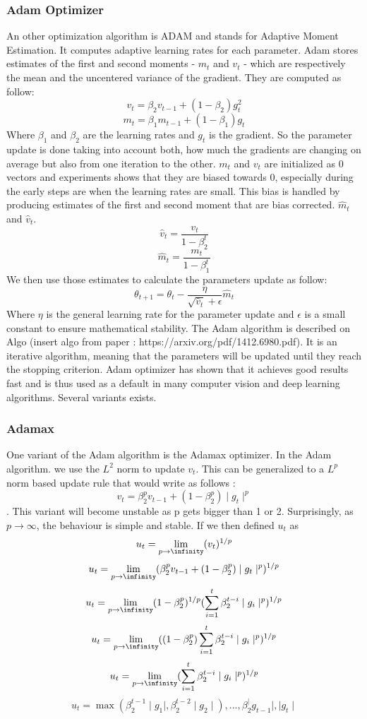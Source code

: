 \subsubsection{Adam Optimizer}
An other optimization algorithm is ADAM and stands for Adaptive Moment Estimation. It computes adaptive learning rates for each parameter. Adam stores estimates of the first and second moments - \(m_t\) and \(v_t\) - which are respectively the mean and the uncentered variance of the gradient. They are computed as follow: \[ v_t = \beta_2 v_{t-1} + (1 - \beta_2)g_t^2 \] \[m_t = \beta_1 m_{t-1} + (1 - \beta_1)g_t \]
Where \(\beta_1\) and \(\beta_2\) are the learning rates and \(g_t\) is the gradient. So the parameter update is done taking into account both, how much the gradients are changing on average but also from one iteration to the other.  \(m_t\) and \(v_t\) are initialized as 0 vectors and experiments shows that they are biased towards 0, especially during the early steps are when the learning rates are small. This bias is handled by producing estimates of the first and second moment that are bias corrected. \(\hat{m}_t\) and \(\hat{v}_t\). 
\[ \hat{v}_t=  \frac{v_{t}}{1 - \beta_2^t}\] 
\[\hat{m}_t=  \frac{m_{t}}{1 - \beta_1^t}\] 
We then use those estimates to calculate the parameters update as follow: \[\theta_{t+1} = \theta_t - \frac{\eta}{\sqrt{\hat{v}_t} + \epsilon}\hat{m}_t\]
Where \(\eta\) is the general learning rate for the parameter update and \(\epsilon\) is a small constant to ensure mathematical stability. 
The Adam algorithm is described on Algo (insert algo from paper : https://arxiv.org/pdf/1412.6980.pdf). It is an iterative algorithm, meaning that the parameters will be updated until they reach the stopping criterion. 
Adam optimizer has shown that it achieves good results fast and is thus used as a default in many computer vision and deep learning algorithms. Several variants exists.
\subsubsection{Adamax}
One variant of the Adam algorithm is the Adamax optimizer. In the Adam algorithm. we use the \(L^2\) norm to update \(v_t\). This can be generalized to a \(L^p\) norm based update rule that would write as follows : \[ v_t = \beta_2^p v_{t-1} + (1 - \beta_2^p) \mid g_t\mid^p \] . This variant will become unstable as p gets bigger than 1 or 2. Surprisingly, as \(p\to\infty\), the behaviour is simple and stable. If we then defined \(u_t\) as \[u_t = \lim_{p\to\infinity}(v_t)^{1/p}\]
\[u_t = \lim_{p\to\infinity}(\beta_2^p v_{t-1} + (1 - \beta_2^p)\mid g_t\mid^p)^{1/p}\] 
\[u_t = \lim_{p\to\infinity}(1 - \beta_2^p)^{1/p}(\sum_{i=1}^{t}\beta_2^{t-i} \mid g_i\mid ^p)^{1/p}\]
\[u_t = \lim_{p\to\infinity}((1 - \beta_2^p) \sum_{i=1}^{t}\beta_2^{t-i} \mid g_i\mid ^p)^{1/p}\]
\[u_t = \lim_{p\to\infinity}(\sum_{i=1}^{t}\beta_2^{t-i} \mid g_i\mid ^p)^{1/p}\]
\[u_t = \max (\beta_2^{t-1}  \mid g_1\mid, \beta_2^{t-2}  \mid g_2\mid ), ..., \beta_2^ \mid g_{t-1}\mid, \mid g_t\mid\]

